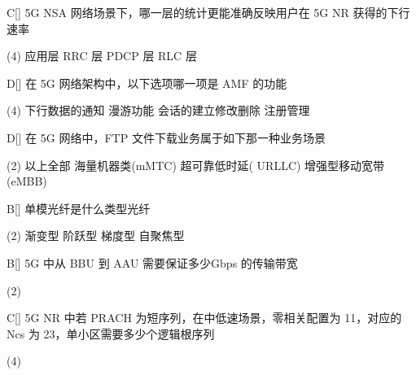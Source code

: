 \begin{choice}{C}[]
    5G NSA 网络场景下，哪一层的统计更能准确反映用户在 5G NR 获得的下行速率
    \begin{tasks}(4)
        \task 应用层
        \task RRC 层
        \task PDCP 层
        \task RLC 层
    \end{tasks}
\end{choice}

\begin{choice}{D}[]
    在 5G 网络架构中，以下选项哪一项是 AMF 的功能
    \begin{tasks}(4)
        \task 下行数据的通知
        \task 漫游功能
        \task 会话的建立修改删除
        \task 注册管理
    \end{tasks}
\end{choice}


\begin{choice}{D}[]
    在 5G 网络中，FTP 文件下载业务属于如下那一种业务场景
    \begin{tasks}(2)
        \task 以上全部
        \task 海量机器类(mMTC)
        \task 超可靠低时延( URLLC)
        \task 增强型移动宽带(eMBB)
    \end{tasks}
\end{choice}


\begin{choice}{B}[]
    单模光纤是什么类型光纤
    \begin{tasks}(2)
        \task 渐变型
        \task 阶跃型
        \task 梯度型
        \task 自聚焦型
    \end{tasks}
\end{choice}



\begin{choice}{B}[]
    5G 中从 BBU 到 AAU 需要保证多少Gbps 的传输带宽
    \begin{tasks}(2)
    \end{tasks}
\end{choice}




\begin{choice}{C}[]
    5G NR 中若 PRACH 为短序列，在中低速场景，零相关配置为 11，对应的 Ncs 为 23，单小区需要多少个逻辑根序列
    \begin{tasks}(4)
    \end{tasks}
\end{choice}

